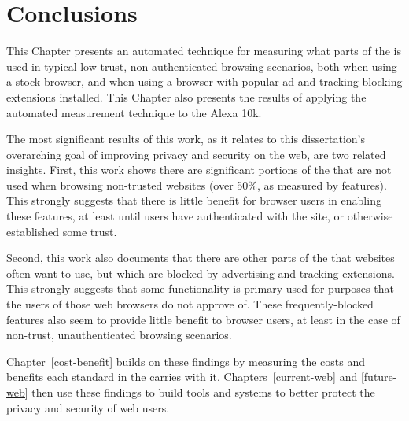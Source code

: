 \section{Conclusions}
\label{measurement:conclusions}

This Chapter presents an automated technique for measuring what parts of the
\WAPI is used in typical low-trust, non-authenticated browsing scenarios, both
when using a stock browser, and when using a browser with popular
ad and tracking blocking extensions installed.  This Chapter also presents the results
of applying the automated measurement technique to the Alexa 10k.

The most significant results of this work, as it relates to this
dissertation's overarching goal of improving privacy and security on the web,
are two related insights.  First, this work shows there are significant
portions of the \WAPI that are not used when browsing non-trusted websites
(over 50\%, as measured by \WAPI features).  This strongly suggests that there
is little benefit for browser users in enabling these features, at least until
users have authenticated with the site, or otherwise established some trust.

Second, this work also documents that there are other parts of the \WAPI
that websites often want to use, but which are blocked by advertising
and tracking extensions.  This strongly suggests that some \WAPI functionality
is primary used for purposes that the users of those web browsers do not
approve of.  These frequently-blocked features also seem to provide little
benefit to browser users, at least in the case of non-trust, unauthenticated
browsing scenarios.

Chapter~\ref{cost-benefit} builds on these findings by measuring the costs
and benefits each standard in the \WAPI carries with it.
Chapters~\ref{current-web} and \ref{future-web} then use these findings to
build tools and systems to better protect the privacy and security of web
users.
